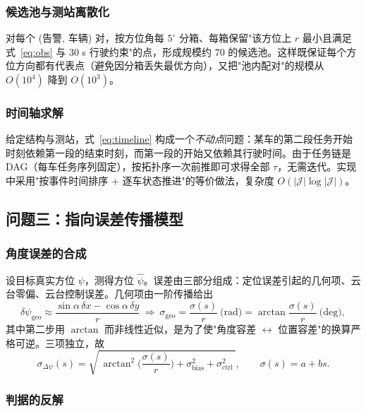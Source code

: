 \documentclass[UTF8,a4paper,zihao=-4,oneside]{ctexart}
\begin{document}
\subsubsection{候选池与测站离散化}

对每个 (告警, 车辆) 对，按方位角每 $5^\circ$ 分箱、每箱保留"该方位上 $r$ 最小且满足式~\eqref{eq:obs} 与 $30$ s 行驶约束"的点，形成规模约 $70$ 的候选池。这样既保证每个方位方向都有代表点（避免因分箱丢失最优方向），又把"池内配对"的规模从 $O(10^4)$ 降到 $O(10^3)$。

\subsubsection{时间轴求解}

给定结构与测站，式~\eqref{eq:timeline} 构成一个\emph{不动点}问题：某车的第二段任务开始时刻依赖第一段的结束时刻，而第一段的开始又依赖其行驶时间。由于任务链是 DAG（每车任务序列固定），按拓扑序一次前推即可求得全部 $\tau$，无需迭代。实现中采用"按事件时间排序 + 逐车状态推进"的等价做法，复杂度 $O(|\mathcal{J}|\log|\mathcal{J}|)$。

\subsection{问题三：指向误差传播模型}

\subsubsection{角度误差的合成}

设目标真实方位 $\psi$，测得方位 $\hat\psi$。误差由三部分组成：定位误差引起的几何项、云台零偏、云台控制误差。几何项由一阶传播给出
\begin{equation}
\label{eq:geo}
\delta\psi_{\mathrm{geo}}\approx\frac{\sin\alpha\,\delta x-\cos\alpha\,\delta y}{r}
\ \Longrightarrow\
\sigma_{\mathrm{geo}}=\frac{\sigma(s)}{r}\ \text{(rad)}
=\arctan\frac{\sigma(s)}{r}\ \text{(deg)},
\end{equation}
其中第二步用 $\arctan$ 而非线性近似，是为了使"角度容差 $\leftrightarrow$ 位置容差"的换算严格可逆。三项独立，故
\begin{equation}
\label{eq:sigmapsi}
\sigma_{\Delta\psi}(s)=\sqrt{\ \arctan^2\!\Big(\frac{\sigma(s)}{r}\Big)+\sigma_{\mathrm{bias}}^2+\sigma_{\mathrm{ctrl}}^2\ },\qquad
\sigma(s)=a+bs .
\end{equation}

\subsubsection{判据的反解}
\end{document}
